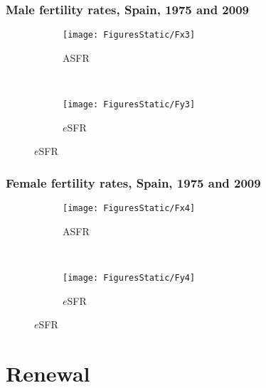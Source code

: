 \documentclass{beamer}
\begin{document}
\begin{frame}
\frametitle{Male fertility rates, Spain, 1975 and 2009}
\vspace{-5em}
\begin{figure}
        \centering
        \begin{subfigure}[b]{0.5\textwidth}
                \centering
                \caption*{ASFR}
                \texttt{[image: FiguresStatic/Fx3]}
        \end{subfigure}%
        ~ %
        \begin{subfigure}[b]{0.5\textwidth}
                \centering
                \caption*{$e$SFR}
                \texttt{[image: FiguresStatic/Fy3]}
        \end{subfigure}
\end{figure}
\end{frame}
\begin{frame}
\frametitle{Female fertility rates, Spain, 1975 and 2009}
\vspace{-5em}
\begin{figure}
        \centering
        \begin{subfigure}[b]{0.5\textwidth}
                \centering
                \caption*{ASFR}
                \texttt{[image: FiguresStatic/Fx4]}
        \end{subfigure}%
        ~ %
        \begin{subfigure}[b]{0.5\textwidth}
                \centering
                \caption*{$e$SFR}
                \texttt{[image: FiguresStatic/Fy4]}
        \end{subfigure}
\end{figure}
\end{frame}
\section{Renewal}
\end{document}
